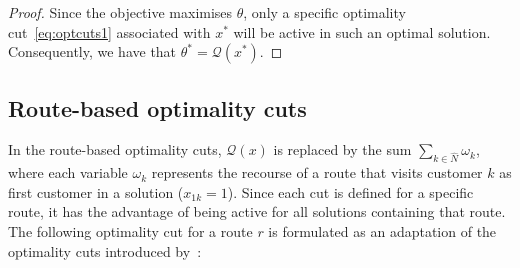 \documentclass[11pt]{article}
\theoremstyle{definition}
\begin{document}
\begin{proof}
 Since the objective maximises $\theta$, only a specific optimality cut~\eqref{eq:optcuts1} associated with $x^*$ will be active in such an optimal solution. Consequently, we have that $\theta^* = \mathcal{Q}(x^*)$.
\end{proof}






\subsection{Route-based optimality cuts}
\label{ssec:route-based}

In the route-based optimality cuts, $\mathcal{Q}(x)$ is replaced by the sum $\sum_{k \in \hat{N}} \omega_k$, where each variable $\omega_k$ represents the recourse of a route that visits customer $k$ as first customer in a solution ($x_{1k}=1$). Since each cut is defined for a specific route, it has the advantage of being active for all solutions containing that route.
%
The following optimality cut for a route $r$ is formulated as an adaptation of the optimality cuts introduced by~\citet{Seguin1994}:
\end{document}
